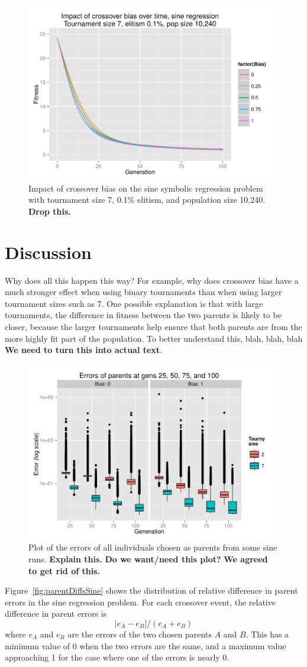 \documentclass{sig-alternate}
\begin{document}
\begin{figure}
\centering
\includegraphics[width=0.45 \textwidth]{Plots/Sine_XO_fitness_vs_gen_t2_e01_p10K.pdf}
\caption{Impact of crossover bias on the sine symbolic regression problem with tournament size 7, 0.1\% elitism, and 
population size 10,240. \textbf{Drop this.}}
\label{fig:sineBiasFitnessVsGenT2E01P10K}
\end{figure}

\section{Discussion} \label{sec:Discussion}

Why does all this happen this way? For example, why does crossover bias have a much stronger effect when using binary
tournaments than when using larger tournament sizes such as 7. One possible explanation is that with large tournaments,
the difference in fitness between the two parents is likely to be closer, because the larger tournaments help ensure
that both parents are from the more highly fit part of the population. To better understand this, blah, blah, blah
\textbf{We need to turn this into actual text}.

\begin{figure}
\centering
\includegraphics[width=0.45 \textwidth]{Plots/Parent_errors_sine.pdf}
\caption{Plot of the errors of all individuals chosen as parents from some sine runs. \textbf{Explain this.} \textbf{Do
we want/need this plot?} \textbf{We agreed to get rid of this.}}
\label{fig:parentErrorsSine}
\end{figure}

Figure~\ref{fig:parentDiffsSine} shows the distribution of relative difference in parent errors in the sine regression 
problem. For each crossover event, the relative difference in parent errors is
\[
	|e_A - e_B] / (e_A + e_B)
\]
where $e_A$ and $e_B$ are the errors of the two chosen parents $A$ and $B$. This has a minimum value of 0 when 
the two errors are the same, and a maximum value approaching 1 for the case where one of the errors is nearly 0.
\end{document}

